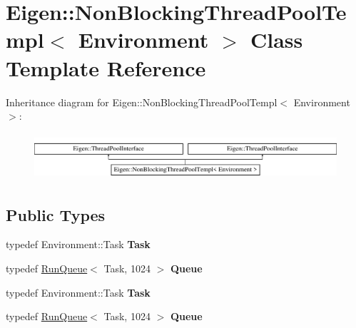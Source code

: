 \hypertarget{class_eigen_1_1_non_blocking_thread_pool_templ}{}\section{Eigen\+:\+:Non\+Blocking\+Thread\+Pool\+Templ$<$ Environment $>$ Class Template Reference}
\label{class_eigen_1_1_non_blocking_thread_pool_templ}
Inheritance diagram for Eigen\+:\+:Non\+Blocking\+Thread\+Pool\+Templ$<$ Environment $>$\+:\begin{figure}[H]
\begin{center}
\leavevmode
\includegraphics[height=1.744548cm]{class_eigen_1_1_non_blocking_thread_pool_templ}
\end{center}
\end{figure}
\subsection*{Public Types}
\begin{DoxyCompactItemize}
\item 
\mbox{\label{class_eigen_1_1_non_blocking_thread_pool_templ_acaaa2b0a3fb4bfb40668c251fac5b670}} 
typedef Environment\+::\+Task {\bfseries Task}
\item 
\mbox{\label{class_eigen_1_1_non_blocking_thread_pool_templ_a79a61760383e9778aebf71e50167c78c}} 
typedef \hyperlink{class_eigen_1_1_run_queue}{Run\+Queue}$<$ Task, 1024 $>$ {\bfseries Queue}
\item 
\mbox{\label{class_eigen_1_1_non_blocking_thread_pool_templ_acaaa2b0a3fb4bfb40668c251fac5b670}} 
typedef Environment\+::\+Task {\bfseries Task}
\item 
\mbox{\label{class_eigen_1_1_non_blocking_thread_pool_templ_a79a61760383e9778aebf71e50167c78c}} 
typedef \hyperlink{class_eigen_1_1_run_queue}{Run\+Queue}$<$ Task, 1024 $>$ {\bfseries Queue}
\end{DoxyCompactItemize}
